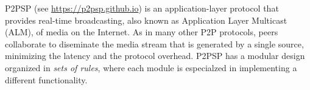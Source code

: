 P2PSP (see \url{https://p2psp.github.io}) is an application-layer
protocol that provides real-time broadcasting, also known as
Application Layer Multicast (ALM), of media on the Internet. As in
many other P2P protocols, peers collaborate to diseminate the media
stream that is generated by a single source, minimizing the latency
and the protocol overhead. P2PSP has a modular design organized
in \emph{sets of rules}, where each module is especialzed in
implementing a different functionality.
